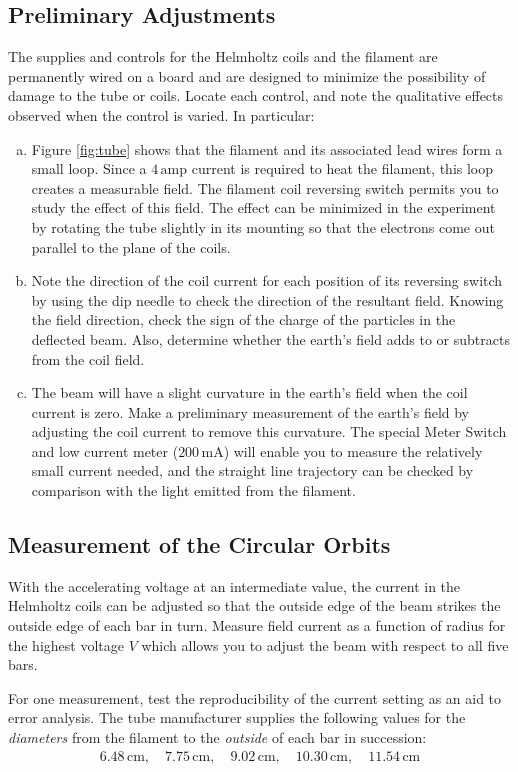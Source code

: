 \subsection{Preliminary Adjustments}
The supplies and controls for the Helmholtz coils and the filament are permanently wired on a board and are designed to minimize the possibility of damage to the tube or coils. Locate each control, and note the qualitative effects observed when the control is varied. In particular:
\begin{enumerate}[(a)]
\item Figure {\ref{fig:tube}} shows that the filament and its associated lead wires form a small loop. Since a $4\,\mathrm{amp}$ current is required to heat the filament, this loop creates a measurable field. The filament coil reversing switch permits you to study the effect of this field. The effect can be minimized in the experiment by rotating the tube slightly in its mounting so that the electrons come out parallel to the plane of the coils.
\item Note the direction of the coil current for each position of its reversing switch by using the dip needle to check the direction of the resultant field. Knowing the field direction, check the sign of the charge of the particles in the deflected beam. Also, determine whether the earth's field adds to or subtracts from the coil field.
\item The beam will have a slight curvature in the earth's field when the coil current is zero. Make a preliminary measurement of the earth's field by adjusting the coil current to remove this curvature. The special Meter Switch and low current meter ($200\, \mathrm{mA}$) will enable you to measure the relatively small current needed, and the straight line trajectory can be checked by comparison with the light emitted from the filament.
\end{enumerate}

\subsection{Measurement of the Circular Orbits}
With the accelerating voltage at an intermediate value, the current in the Helmholtz coils can be adjusted so that the outside edge of the beam strikes the outside edge of each bar in turn. Measure field current as a function of radius for the highest voltage $V$ which allows you to adjust the beam with respect to all five bars.\myskip

For one measurement, test the reproducibility of the current setting as an aid to error analysis. The tube manufacturer supplies the following values for the \emph{diameters} from the filament to the \emph{outside} of each bar in succession:
\begin{gather*}
6.48\,\textrm{cm},\quad 7.75\,\textrm{cm},\quad 9.02\,\textrm{cm},\quad 10.30\,\textrm{cm},\quad 11.54\,\textrm{cm}
\end{gather*}

